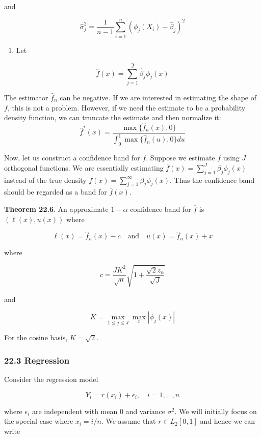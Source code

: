 and

\[ \hat{\sigma}_j^2 = \frac{1}{n - 1} \sum_{i=1}^n \left( \phi_j(X_i) - \hat{\beta}_j\right)^2 \]

\begin{enumerate}[tightlist,label={\arabic*.},resume]
\item
  Let
\end{enumerate}

\[ \hat{f}(x) = \sum_{j=1}^\hat{J} \hat{\beta}_j \phi_j(x) \]

The estimator \(\hat{f}_n\) can be negative. If we are interested in
estimating the shape of \(f\), this is not a problem. However, if we
need the estimate to be a probability density function, we can truncate
the estimate and then normalize it:\\
\[\hat{f}^*(x) = \frac{\max \{ \hat{f}_n(x), 0 \}}{\int_0^1 \max \{ \hat{f}_n(u), 0 \} du}\]

Now, let us construct a confidence band for \(f\). Suppose we estimate
\(f\) using \(J\) orthogonal functions. We are essentially estimating
\(\overline{f}(x) = \sum_{j=1}^J \beta_j \phi_j(x)\) instead of the true
density \(f(x) = \sum_{j=1}^\infty \beta_j \phi_j(x)\). Thus the
confidence band should be regarded as a band for \(\overline{f}(x)\).

\textbf{Theorem 22.6}. An approximate \(1 - \alpha\) confidence band for
\(\overline{f}\) is \((\ell(x), u(x))\) where

\[
\ell(x) = \hat{f}_n(x) - c
\quad \text{and} \quad
u(x) = \hat{f}_n(x) + x
\]

where

\[ c = \frac{JK^2}{\sqrt{n}} \sqrt{1 + \frac{\sqrt{2} z_{\alpha}}{\sqrt{J}}} \]

and

\[ K = \max_{1 \leq j \leq J} \max_x | \phi_j(x) | \]

For the cosine basis, \(K = \sqrt{2}\).

\subsubsection{22.3 Regression}\label{regression}

Consider the regression model

\[ Y_i = r(x_i) + \epsilon_i, \quad i = 1, \dots, n\]

where \(\epsilon_i\) are independent with mean 0 and variance
\(\sigma^2\). We will initially focus on the special case where
\(x_i = i / n\). We assume that \(r \in L_2[0, 1]\) and hence we can
write

